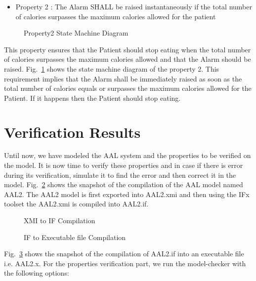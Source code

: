 \documentclass[a4paper,twoside]{article}
\begin{document}
\begin{itemize}
\item Property 2 : The Alarm SHALL be raised instantaneously if the total number of calories surpasses the maximum calories allowed for the patient 
\end{itemize}

\begin{figure}[!h]
  \centering
  {}
  \caption{Property2 State Machine Diagram}
  \label{fig:property3stm}
 \end{figure}
 
  
This property ensures that the Patient should stop eating when the total number of calories surpasses the maximum calories allowed and that the Alarm should be raised. Fig.~\ref{fig:property3stm} shows the state machine diagram of the property 2. This requirement implies that the Alarm shall be immediately raised as soon as the total number of calories equals or surpasses the maximum calories allowed for the Patient. If it happens then the Patient should stop eating.  

\section{Verification Results}
\label{sec:results}
Until now, we have modeled the AAL system and the properties to be verified on the model. It is now time to verify these properties and in case if there is error during its verification, simulate it to find the error and then correct it in the model. Fig.~\ref{fig:xmi2if} shows the snapshot of the compilation of the AAL model named AAL2. The AAL2 model is first exported into AAL2.xmi and then using the IFx toolset the AAL2.xmi is compiled into AAL2.if.

\begin{figure}[!h]
  \centering
  {}
  \caption{XMI to IF Compilation}
  \label{fig:xmi2if}
 \end{figure}
  
\begin{figure}[!h]
  \centering
  {}
  \caption{IF to Executable file Compilation}
  \label{fig:if2exe}
 \end{figure}
 
Fig.~\ref{fig:if2exe} shows the snapshot of the compilation of AAL2.if into an executable file i.e. AAL2.x. 
For the properties verification part, we run the model-checker with the following options:
\end{document}
